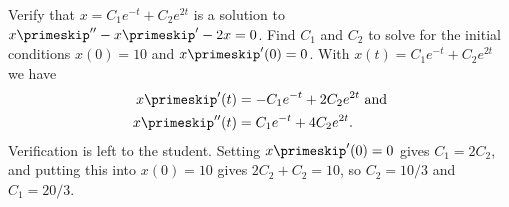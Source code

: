 {Verify that $x = C_1 e^{-t} + C_2 e^{2t}$ is a solution to $x\primeskip'' - x\primeskip' -2 x =
0$.  Find $C_1$ and $C_2$ to solve for the initial conditions $x(0) = 10$
and $x\primeskip'(0) = 0$.}
{With $x(t) = C_1e^{-t}+C_2e^{2t}$ we have
\begin{align*}
x\primeskip'(t) & = -C_1e^{-t}+2C_2e^{2t} \text{ and}\\
x\primeskip''(t) & = C_1e^{-t}+4C_2e^{2t}.
\end{align*}
Verification is left to the student. Setting $x\primeskip'(0)=0$ gives $C_1=2C_2$, and putting this into $x(0)=10$ gives $2C_2+C_2=10$, so $C_2=10/3$ and $C_1 = 20/3$.
}
